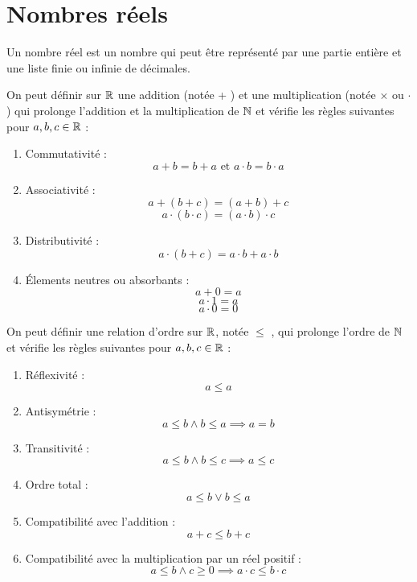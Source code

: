 \chapter{Nombres réels}\label{chap:nb_reels}
\def\arraystretch{1}

\begin{definition}
    Un nombre réel est un nombre qui peut être représenté par une partie entière et une liste finie ou infinie de décimales.
\end{definition}

\begin{proposition}
    On peut définir sur $\mathbb{R}$ une addition (notée \og + \fg) et une multiplication (notée \og $\times$ \fg ou \og $\cdot$ \fg) qui prolonge l'addition et la multiplication de $\mathbb{N}$ et vérifie les règles suivantes pour $a, b, c \in \mathbb{R}$ :
    \begin{enumerate}
        \item Commutativité : 
        \[ a + b = b + a \text{ et } a \cdot b = b \cdot a \]
        \item Associativité : 
        \[ a + (b + c) = (a + b) + c \]
        \[ a \cdot (b \cdot c) = (a \cdot b) \cdot c \]
        \item Distributivité : 
        \[ a \cdot (b + c) = a \cdot b + a \cdot b \]
        \item \'Elements neutres ou absorbants :
        \[ a + 0 = a \]
        \[ a \cdot 1 = a \]
        \[a \cdot 0 = 0 \]
    \end{enumerate}
\end{proposition}

\begin{proposition}
    On peut définir une relation d'ordre sur $\mathbb{R}$, notée \og $\leq$ \fg, qui prolonge l'ordre de $\mathbb{N}$ et vérifie les règles suivantes pour $a, b, c \in \mathbb{R}$ :
    \begin{enumerate}
        \item Réflexivité : 
        \[ a \leq a \]
        \item Antisymétrie : 
        \[ a \leq b \land b \leq a \implies a = b \]
        \item Transitivité : 
        \[ a \leq b \land b \leq c \implies a \leq c \]
        \item Ordre total : 
        \[ a \leq b \lor b \leq a \]
        \item Compatibilité avec l'addition :
        \[ a + c \leq b + c \]
        \item Compatibilité avec la multiplication par un réel positif :
        \[ a \leq b \land c \geq 0 \implies a \cdot c \leq b \cdot c \]
    \end{enumerate}
\end{proposition}


